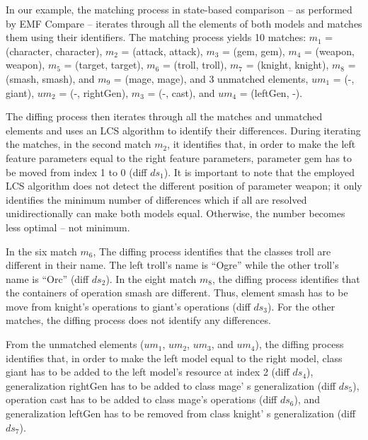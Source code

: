 In our example, the matching process in state-based comparison -- as performed by EMF Compare \cite{emfcompare2018developer} -- iterates through all the elements of both models and matches them using their identifiers. The matching process yields 10 matches: $m_1$ = (\textsf{character}, \textsf{character}), $m_2$ = (\textsf{attack}, \textsf{attack}), $m_3$ = (\textsf{gem}, \textsf{gem}), $m_4$ = (\textsf{weapon}, \textsf{weapon}), $m_5$ = (\textsf{target}, \textsf{target}), $m_6$ = (\textsf{troll}, \textsf{troll}), $m_7$ = (\textsf{knight}, \textsf{knight}), $m_8$ = (\textsf{smash}, \textsf{smash}), and $m_9$ = (\textsf{mage}, \textsf{mage}), and 3 unmatched elements, $um_1$ = (-, \textsf{giant}), $um_2$ = (-, \textsf{rightGen}), $m_3$ = (-, \textsf{cast}), and $um_4$ = (\textsf{leftGen}, -). 

The diffing process then iterates through all the matches and unmatched elements and uses an LCS algorithm to identify their differences. During iterating the matches, in the second match $m_2$, it identifies that, in order to make the left feature \textsf{parameters} equal to the right feature \textsf{parameters}, parameter \textsf{gem} has to be moved from index 1 to 0 (diff $ds_1$). It is important to note that the employed LCS algorithm does not detect the different position of parameter \textsf{weapon}; it only identifies the minimum number of differences which if all are resolved unidirectionally can make both models equal. Otherwise, the number becomes less optimal -- not minimum.

In the six match $m_6$, The diffing process identifies that the classes \textsf{troll} are different in their \textsf{name}. The left \textsf{troll}'s \textsf{name} is ``Ogre'' while the other \textsf{troll}'s \textsf{name} is ``Orc'' (diff $ds_2$). In the eight match $m_8$, the diffing process identifies that the containers of operation \textsf{smash} are different. Thus, element \textsf{smash} has to be move from \textsf{knight}'s \textsf{operations} to \textsf{giant}'s \textsf{operations} (diff $ds_3$). For the other matches, the diffing process does not identify any differences. 

From the unmatched elements ($um_1$, $um_2$, $um_3$, and $um_4$), the diffing process identifies that, in order to make the left model equal to the right model, class \textsf{giant} has to be added to the left model's resource at index 2 (diff $ds_4$), generalization \textsf{rightGen} has to be added to class \textsf{mage}' s \textsf{generalization} (diff $ds_5$), operation \textsf{cast} has to be added to class \textsf{mage}'s \textsf{operations} (diff $ds_6$), and  generalization \textsf{leftGen} has to be removed from class \textsf{knight}' s \textsf{generalization} (diff $ds_7$).

